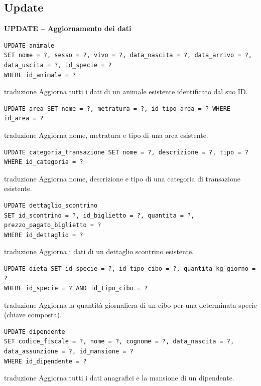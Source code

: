 \documentclass[12pt,a4paper]{report}
\begin{document}
\subsection{Update}

\newpage
\textbf{UPDATE -- Aggiornamento dei dati}

\begin{lstlisting}[style=sqlstyle]
UPDATE animale
SET nome = ?, sesso = ?, vivo = ?, data_nascita = ?, data_arrivo = ?, data_uscita = ?, id_specie = ?
WHERE id_animale = ?
\end{lstlisting}
traduzione {Aggiorna tutti i dati di un animale esistente identificato dal suo ID.}

\begin{lstlisting}[style=sqlstyle]
UPDATE area SET nome = ?, metratura = ?, id_tipo_area = ? WHERE id_area = ?
\end{lstlisting}
traduzione {Aggiorna nome, metratura e tipo di una area esistente.}

\begin{lstlisting}[style=sqlstyle]
UPDATE categoria_transazione SET nome = ?, descrizione = ?, tipo = ? WHERE id_categoria = ?
\end{lstlisting}
traduzione {Aggiorna nome, descrizione e tipo di una categoria di transazione esistente.}

\begin{lstlisting}[style=sqlstyle]
UPDATE dettaglio_scontrino
SET id_scontrino = ?, id_biglietto = ?, quantita = ?, prezzo_pagato_biglietto = ?
WHERE id_dettaglio = ?
\end{lstlisting}
traduzione {Aggiorna i dati di un dettaglio scontrino esistente.}

\begin{lstlisting}[style=sqlstyle]
UPDATE dieta SET id_specie = ?, id_tipo_cibo = ?, quantita_kg_giorno = ?
WHERE id_specie = ? AND id_tipo_cibo = ?
\end{lstlisting}
traduzione {Aggiorna la quantità giornaliera di un cibo per una determinata specie (chiave composta).}

\begin{lstlisting}[style=sqlstyle]
UPDATE dipendente
SET codice_fiscale = ?, nome = ?, cognome = ?, data_nascita = ?, data_assunzione = ?, id_mansione = ?
WHERE id_dipendente = ?
\end{lstlisting}
traduzione {Aggiorna tutti i dati anagrafici e la mansione di un dipendente.}
\end{document}
